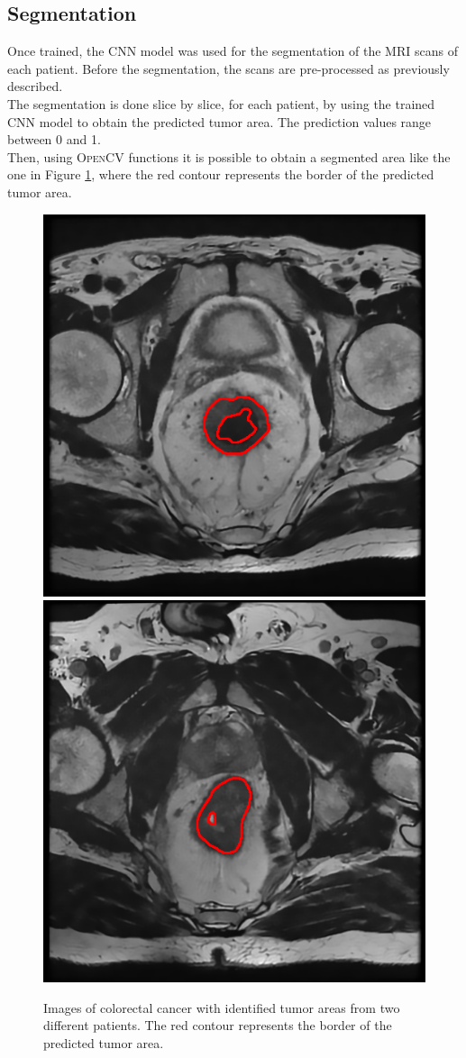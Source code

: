 \documentclass{standalone}
\begin{document}
\subsection{Segmentation}
Once trained, the CNN model was used for the segmentation of the MRI scans of each patient.
Before the segmentation, the scans are pre-processed as previously described.
\\
The segmentation is done slice by slice, for each patient, by using the trained CNN model to obtain the predicted tumor area.
The prediction values range between 0 and 1.
\\
Then, using \textsc{OpenCV}\cite{opencv_library} functions it is possible to obtain a segmented area like the one in Figure \ref{contoured}, where the red contour represents the border of the predicted tumor area.


\begin{figure}[htp]

    \centering
    \includegraphics[width=.49\textwidth]{../images/BO56_9_cont.png}
    \includegraphics[width=.49\textwidth]{../images/BO85_6_cont.png}
    
    \caption{Images of colorectal cancer with identified tumor areas from two different patients. The red contour represents the border of the predicted tumor area.}
    \label{contoured}
    
    \end{figure}
\end{document}
